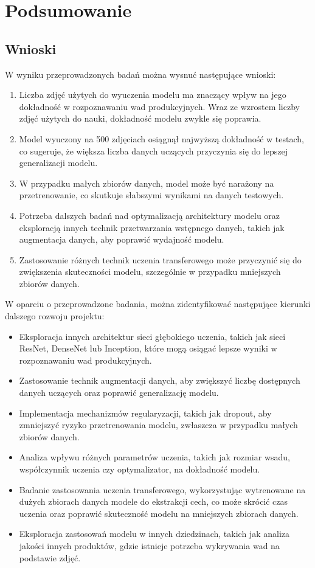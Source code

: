 \chapter{Podsumowanie}
\section{Wnioski}
W wyniku przeprowadzonych badań można wysnuć następujące wnioski:

\begin{enumerate}
\item Liczba zdjęć użytych do wyuczenia modelu ma znaczący wpływ na jego dokładność w rozpoznawaniu wad produkcyjnych. Wraz ze wzrostem liczby zdjęć użytych do nauki, dokładność modelu zwykle się poprawia.
\item Model wyuczony na 500 zdjęciach osiągnął najwyższą dokładność w testach, co sugeruje, że większa liczba danych uczących przyczynia się do lepszej generalizacji modelu.
\item W przypadku małych zbiorów danych, model może być narażony na przetrenowanie, co skutkuje słabszymi wynikami na danych testowych.
\item Potrzeba dalszych badań nad optymalizacją architektury modelu oraz eksploracją innych technik przetwarzania wstępnego danych, takich jak augmentacja danych, aby poprawić wydajność modelu.
\item Zastosowanie różnych technik uczenia transferowego może przyczynić się do zwiększenia skuteczności modelu, szczególnie w przypadku mniejszych zbiorów danych.
\end{enumerate}

W oparciu o przeprowadzone badania, można zidentyfikować następujące kierunki dalszego rozwoju projektu:

\begin{itemize}
\item Eksploracja innych architektur sieci głębokiego uczenia, takich jak sieci ResNet, DenseNet lub Inception, które mogą osiągać lepsze wyniki w rozpoznawaniu wad produkcyjnych.
\item Zastosowanie technik augmentacji danych, aby zwiększyć liczbę dostępnych danych uczących oraz poprawić generalizację modelu.
\item Implementacja mechanizmów regularyzacji, takich jak dropout, aby zmniejszyć ryzyko przetrenowania modelu, zwłaszcza w przypadku małych zbiorów danych.
\item Analiza wpływu różnych parametrów uczenia, takich jak rozmiar wsadu, współczynnik uczenia czy optymalizator, na dokładność modelu.
\item Badanie zastosowania uczenia transferowego, wykorzystując wytrenowane na dużych zbiorach danych modele do ekstrakcji cech, co może skrócić czas uczenia oraz poprawić skuteczność modelu na mniejszych zbiorach danych.
\item Eksploracja zastosowań modelu w innych dziedzinach, takich jak analiza jakości innych produktów, gdzie istnieje potrzeba wykrywania wad na podstawie zdjęć.
\end{itemize}

